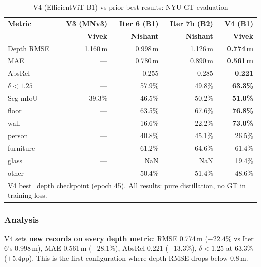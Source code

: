 \documentclass[11pt,a4paper]{article}
\begin{document}
\begin{table}[h]
\centering
\caption{V4 (EfficientViT-B1) vs prior best results: NYU GT evaluation}
\label{tab:vivek-v4-eval}
\begin{tabular}{lrrrr}
\toprule
\textbf{Metric} & \textbf{V3 (MNv3)} & \textbf{Iter 6 (B1)} & \textbf{Iter 7b (B2)} & \textbf{V4 (B1)} \\
                 & \textbf{Vivek}      & \textbf{Nishant}     & \textbf{Nishant}      & \textbf{Vivek} \\
\midrule
Depth RMSE       & 1.160\,m & 0.998\,m & 1.126\,m & \textcolor{improved}{\textbf{0.774\,m}} \\
MAE              & ---      & 0.780\,m & 0.890\,m & \textcolor{improved}{\textbf{0.561\,m}} \\
AbsRel           & ---      & 0.255    & 0.285    & \textcolor{improved}{\textbf{0.221}} \\
$\delta < 1.25$  & ---      & 57.9\%   & 49.8\%   & \textcolor{improved}{\textbf{63.3\%}} \\
\midrule
Seg mIoU         & 39.3\%   & 46.5\%   & 50.2\%   & \textcolor{improved}{\textbf{51.0\%}} \\
\quad floor      & ---      & 63.5\%   & 67.6\%   & \textcolor{improved}{\textbf{76.8\%}} \\
\quad wall       & ---      & 16.6\%   & 22.2\%   & \textcolor{improved}{\textbf{73.0\%}} \\
\quad person     & ---      & 40.8\%   & 45.1\%   & \textcolor{regression}{26.5\%} \\
\quad furniture  & ---      & 61.2\%   & 64.6\%   & \textcolor{regression}{61.4\%} \\
\quad glass      & ---      & NaN      & NaN      & \textcolor{improved}{19.4\%} \\
\quad other      & ---      & 50.4\%   & 51.4\%   & \textcolor{regression}{48.6\%} \\
\bottomrule
\multicolumn{5}{l}{\footnotesize V4 best\_depth checkpoint (epoch 45). All results: pure distillation, no GT in training loss.} \\
\end{tabular}
\end{table}

\subsubsection{Analysis}

V4 sets \textbf{new records on every depth metric}: RMSE 0.774\,m ($-22.4\%$
vs Iter 6's 0.998\,m), MAE 0.561\,m ($-28.1\%$), AbsRel 0.221 ($-13.3\%$),
$\delta < 1.25$ at 63.3\% ($+5.4$pp). This is the first configuration where
depth RMSE drops below 0.8\,m.
\end{document}
